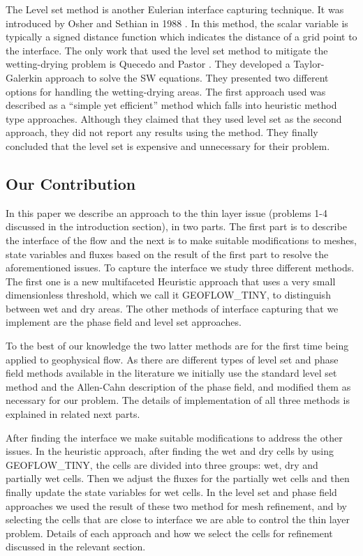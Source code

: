 \documentclass[letterpaper,10pt]{article}
\begin{document}
The Level set method is another Eulerian interface capturing technique. It was introduced by Osher and Sethian in 1988 \cite{Osher1988}. In this method, the scalar variable is typically 
a signed distance function which indicates the distance of a grid point to the interface. 
The only work that used the level set method to mitigate the wetting-drying problem is Quecedo and Pastor \cite{quecedo2002rtg}. 
They developed a Taylor-Galerkin approach to solve the SW equations. They presented two 
different options for handling the wetting-drying areas. The first approach used was described as a ``simple yet efficient'' method which falls into heuristic method type approaches. 
Although they claimed that they used level set as the second approach, they did not report any results using the method.
They finally concluded that the level set is expensive and unnecessary for their problem.\newline


\subsection{Our Contribution}
In this paper we describe an approach to the thin layer issue (problems 1-4 discussed in the introduction section), in two parts. 
The first part is to describe the interface of the 
flow and the next is to make suitable modifications to meshes, state variables and fluxes based on the result of the first part to resolve the aforementioned issues.
To capture the interface we study three different methods. The first one is a new multifaceted Heuristic approach that uses a very small dimensionless threshold, which we call it GEOFLOW\_TINY, to 
distinguish between wet and dry areas. The other methods of interface capturing that we implement are the phase field and level set approaches.

To the best of our knowledge the two latter methods are for the first time being applied to geophysical flow. 
As there are different types of level set and phase field methods available in the 
literature we initially use the standard level set method and the Allen-Cahn description of the phase field, and modified them as necessary for our problem. 
The details of implementation of all three methods is explained in related next parts.

After finding the interface we make suitable modifications to address the other issues. In the heuristic approach, after finding the wet and dry cells by using GEOFLOW\_TINY, the cells are divided 
into three groups: wet, dry and partially wet cells. Then we adjust the fluxes for the partially wet cells and then finally update the state variables for wet cells.
In the level set and phase field approaches we used the result of these two method for mesh refinement, and by selecting the cells that are close to interface we are able to control the thin layer problem. 
Details of each approach and how we select the cells for refinement discussed in the relevant section.
\end{document}
